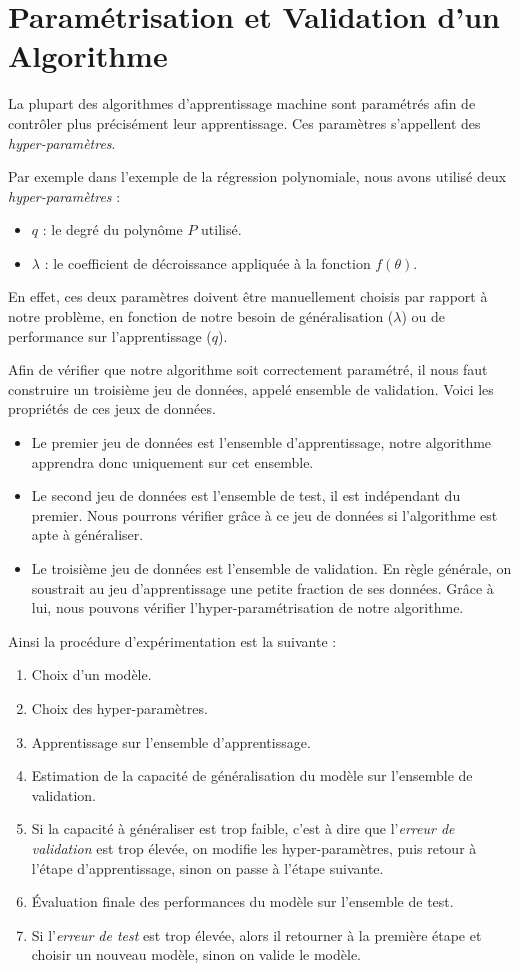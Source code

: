 \documentclass[a4paper, 11pt]{report}
\begin{document}
\section{Paramétrisation et Validation d'un Algorithme}
La plupart des algorithmes d'apprentissage machine sont paramétrés afin de contrôler plus précisément leur apprentissage.
Ces paramètres s'appellent des \emph{hyper-paramètres}.

Par exemple dans l'exemple de la régression polynomiale, nous avons utilisé deux \emph{hyper-paramètres} :
\begin{itemize}
	\item $q$ : le degré du polynôme $P$ utilisé.
	\item $\lambda$ : le coefficient de décroissance appliquée à la fonction $f(\theta)$.
\end{itemize}
En effet, ces deux paramètres doivent être manuellement choisis par rapport à notre problème, en fonction de notre besoin de généralisation ($\lambda$) ou de performance sur l'apprentissage ($q$).

Afin de vérifier que notre algorithme soit correctement paramétré, il nous faut construire un troisième jeu de données, appelé ensemble de validation.
Voici les propriétés de ces jeux de données.
\begin{itemize}
	\item Le premier jeu de données est l'ensemble d'apprentissage, notre algorithme apprendra donc uniquement sur cet ensemble.
	\item Le second jeu de données est l'ensemble de test, il est indépendant du premier. Nous pourrons vérifier grâce à ce jeu de données si l'algorithme est apte à généraliser.
	\item Le troisième jeu de données est l'ensemble de validation. En règle générale, on soustrait au jeu d'apprentissage une petite fraction de ses données. Grâce à lui, nous pouvons vérifier l'hyper-paramétrisation de notre algorithme.
\end{itemize}
Ainsi la procédure d'expérimentation est la suivante :
\begin{enumerate}
	\item Choix d'un modèle.
	\item Choix des hyper-paramètres.
	\item Apprentissage sur l'ensemble d'apprentissage.
	\item Estimation de la capacité de généralisation du modèle sur l'ensemble de validation.
	\item Si la capacité à généraliser est trop faible, c'est à dire que l'\emph{erreur de validation} est trop élevée, on modifie les hyper-paramètres, puis retour à l'étape d'apprentissage, sinon on passe à l'étape suivante.
	\item Évaluation finale des performances du modèle sur l'ensemble de test.
	\item Si l'\emph{erreur de test} est trop élevée, alors il retourner à la première étape et choisir un nouveau modèle, sinon on valide le modèle.
\end{enumerate}
	
\end{document}
